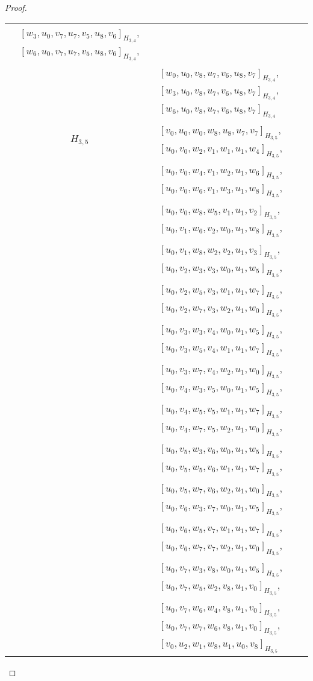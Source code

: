 \begin{subappendices}
\begin{proof}
{\begin{longtable}{|c|l|}
  $[w_3, u_0, v_7, u_7, v_5, u_8, v_6]_{H_{3,4}}$,
  $[w_6, u_0, v_7, u_7, v_5, u_8, v_6]_{H_{3,4}}$, \\* &
  $[w_0, u_0, v_8, u_7, v_6, u_8, v_7]_{H_{3,4}}$,
  $[w_3, u_0, v_8, u_7, v_6, u_8, v_7]_{H_{3,4}}$, \\* &
  $[w_6, u_0, v_8, u_7, v_6, u_8, v_7]_{H_{3,4}}$
\\ \hline
$H_{3,5}$ &
  $[v_0, u_0, w_0, w_8, u_8, u_7, v_7]_{H_{3,5}}$,
  $[u_0, v_0, w_2, v_1, w_1, u_1, w_4]_{H_{3,5}}$, \\* &
  $[u_0, v_0, w_4, v_1, w_2, u_1, w_6]_{H_{3,5}}$,
  $[u_0, v_0, w_6, v_1, w_3, u_1, w_8]_{H_{3,5}}$, \\* &
  $[u_0, v_0, w_8, w_5, v_1, u_1, v_2]_{H_{3,5}}$,
  $[u_0, v_1, w_6, v_2, w_0, u_1, w_8]_{H_{3,5}}$, \\* &
  $[u_0, v_1, w_8, w_2, v_2, u_1, v_3]_{H_{3,5}}$,
  $[u_0, v_2, w_3, v_3, w_0, u_1, w_5]_{H_{3,5}}$, \\* &
  $[u_0, v_2, w_5, v_3, w_1, u_1, w_7]_{H_{3,5}}$,
  $[u_0, v_2, w_7, v_3, w_2, u_1, w_0]_{H_{3,5}}$, \\* &
  $[u_0, v_3, w_3, v_4, w_0, u_1, w_5]_{H_{3,5}}$,
  $[u_0, v_3, w_5, v_4, w_1, u_1, w_7]_{H_{3,5}}$, \\* &
  $[u_0, v_3, w_7, v_4, w_2, u_1, w_0]_{H_{3,5}}$,
  $[u_0, v_4, w_3, v_5, w_0, u_1, w_5]_{H_{3,5}}$, \\* &
  $[u_0, v_4, w_5, v_5, w_1, u_1, w_7]_{H_{3,5}}$,
  $[u_0, v_4, w_7, v_5, w_2, u_1, w_0]_{H_{3,5}}$, \\* &
  $[u_0, v_5, w_3, v_6, w_0, u_1, w_5]_{H_{3,5}}$,
  $[u_0, v_5, w_5, v_6, w_1, u_1, w_7]_{H_{3,5}}$, \\* &
  $[u_0, v_5, w_7, v_6, w_2, u_1, w_0]_{H_{3,5}}$,
  $[u_0, v_6, w_3, v_7, w_0, u_1, w_5]_{H_{3,5}}$, \\* &
  $[u_0, v_6, w_5, v_7, w_1, u_1, w_7]_{H_{3,5}}$,
  $[u_0, v_6, w_7, v_7, w_2, u_1, w_0]_{H_{3,5}}$, \\* &
  $[u_0, v_7, w_3, v_8, w_0, u_1, w_5]_{H_{3,5}}$,
  $[u_0, v_7, w_5, w_2, v_8, u_1, v_0]_{H_{3,5}}$, \\* &
  $[u_0, v_7, w_6, w_4, v_8, u_1, v_0]_{H_{3,5}}$,
  $[u_0, v_7, w_7, w_6, v_8, u_1, v_0]_{H_{3,5}}$, \\* &
  $[v_0, u_2, w_1, w_8, u_1, u_0, v_8]_{H_{3,5}}$
\\ \hline
\end{longtable}
}
\end{proof}



\end{subappendices}
